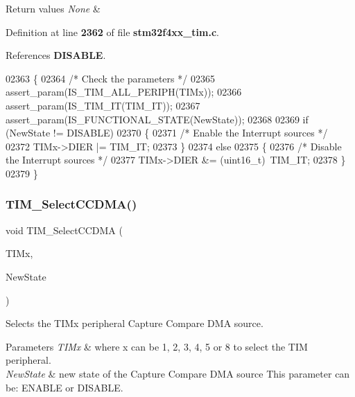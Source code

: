 \begin{DoxyRetVals}{Return values}
{\em None} & \\
\hline
\end{DoxyRetVals}


Definition at line \textbf{ 2362} of file \textbf{ stm32f4xx\+\_\+tim.\+c}.



References \textbf{ D\+I\+S\+A\+B\+LE}.


\begin{DoxyCode}
02363 \{  
02364   \textcolor{comment}{/* Check the parameters */}
02365   assert_param(IS_TIM_ALL_PERIPH(TIMx));
02366   assert_param(IS_TIM_IT(TIM\_IT));
02367   assert_param(IS_FUNCTIONAL_STATE(NewState));
02368   
02369   \textcolor{keywordflow}{if} (NewState != DISABLE)
02370   \{
02371     \textcolor{comment}{/* Enable the Interrupt sources */}
02372     TIMx->DIER |= TIM\_IT;
02373   \}
02374   \textcolor{keywordflow}{else}
02375   \{
02376     \textcolor{comment}{/* Disable the Interrupt sources */}
02377     TIMx->DIER &= (uint16\_t)~TIM\_IT;
02378   \}
02379 \}
\end{DoxyCode}
\mbox{\label{group__TIM__Group5_ga5273cb65acb885fe7982827b1c6b7d75}} 
\subsubsection{T\+I\+M\+\_\+\+Select\+C\+C\+D\+M\+A()}
{\footnotesize\ttfamily void T\+I\+M\+\_\+\+Select\+C\+C\+D\+MA (\begin{DoxyParamCaption}\item[{\textbf{ T\+I\+M\+\_\+\+Type\+Def} $\ast$}]{T\+I\+Mx,  }\item[{\textbf{ Functional\+State}}]{New\+State }\end{DoxyParamCaption})}



Selects the T\+I\+Mx peripheral Capture Compare D\+MA source. 


\begin{DoxyParams}{Parameters}
{\em T\+I\+Mx} & where x can be 1, 2, 3, 4, 5 or 8 to select the T\+IM peripheral. \\
\hline
{\em New\+State} & new state of the Capture Compare D\+MA source This parameter can be\+: E\+N\+A\+B\+LE or D\+I\+S\+A\+B\+LE. \\
\hline
\end{DoxyParams}

